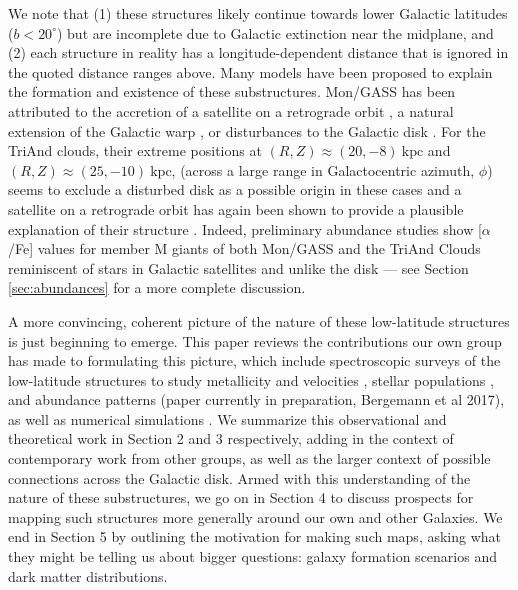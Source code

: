 \documentclass[galaxies,article,submit,moreauthors,pdftex,10pt,a4paper]{mdpi}
\newcommand{\kpc}{\mathrm{kpc}}
\begin{document}
We note that (1) these structures likely continue towards lower Galactic
latitudes ($b < 20^\circ$) but are incomplete due to Galactic extinction near
the midplane, and (2) each structure in reality has a longitude-dependent
distance that is ignored in the quoted distance ranges above.
Many models have been proposed to explain the formation and existence of these
substructures.
Mon/GASS has been attributed to the accretion of a satellite on a retrograde orbit \cite{penarrubia05}, a natural extension of the Galactic warp \cite{momany04,momany06}, or disturbances to the Galactic disk \cite{kazantzidis08,younger08,purcell11,xu15,gomez16}.
For the TriAnd clouds, their extreme positions at $(R,Z) \approx (20, -8)~\kpc$ and $(R,Z) \approx (25, -10)~\kpc$,
(across a large range in Galactocentric azimuth, $\phi$) seems to exclude a disturbed disk as a possible origin in these cases and a satellite on a retrograde orbit has again been shown to provide a plausible explanation of their structure \cite{sheffield14}.
Indeed, preliminary abundance studies show [$\alpha$/Fe] values for member M giants of both Mon/GASS and the TriAnd Clouds reminiscent of stars in Galactic satellites and unlike the disk \cite{chou2010b,chou11} --- see Section \ref{sec:abundances} for a more complete discussion.

A more convincing, coherent picture of the nature of these low-latitude structures is just beginning to emerge.
This paper reviews the contributions our own group has made to formulating this picture, which include spectroscopic surveys of the low-latitude structures to study metallicity and velocities \cite{sheffield14,li17}, stellar populations \cite{pricewhelan15}, and abundance patterns (paper currently in preparation, Bergemann et al 2017), as well as numerical simulations \cite{sheffield14,laporte16}.
We summarize this observational and theoretical work in Section 2 and 3 respectively, adding in the context of contemporary work from other groups, as well as the larger context of possible connections across the Galactic disk.
Armed with this understanding of the nature of these substructures, we go on in Section 4 to discuss prospects for mapping such structures more generally around our own and other Galaxies.
We end in Section 5 by outlining the motivation for making such maps, asking what they might be telling us about bigger questions: galaxy formation scenarios and dark matter distributions.

\end{document}
